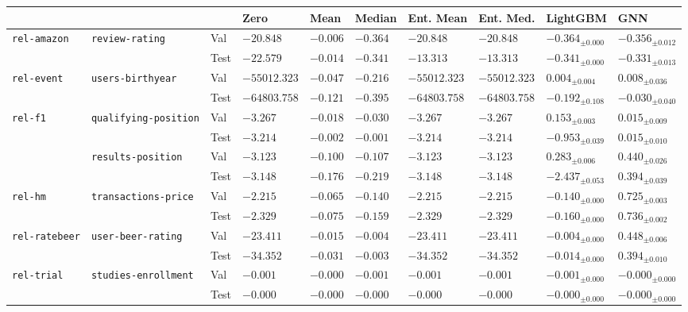 \begin{tabular}{llllllllll}
\toprule
 &  &  & Zero & Mean & Median & Ent. Mean & Ent. Med. & LightGBM & GNN \\
\midrule
\multirow[c]{2}{*}{\texttt{rel-amazon}} & \multirow[c]{2}{*}{\texttt{review-rating}} & Val & $-20.848$ & $\bm{-0.006}$ & $-0.364$ & $-20.848$ & $-20.848$ & $-0.364_{\pm 0.000}$ & $-0.356_{\pm 0.012}$ \\
 &  & Test & $-22.579$ & $\bm{-0.014}$ & $-0.341$ & $-13.313$ & $-13.313$ & $-0.341_{\pm 0.000}$ & $-0.331_{\pm 0.013}$ \\
\cmidrule{1-10} \cmidrule{2-10}
\multirow[c]{2}{*}{\texttt{rel-event}} & \multirow[c]{2}{*}{\texttt{users-birthyear}} & Val & $-55012.323$ & $-0.047$ & $-0.216$ & $-55012.323$ & $-55012.323$ & $0.004_{\pm 0.004}$ & $\bm{0.008}_{\pm 0.036}$ \\
 &  & Test & $-64803.758$ & $-0.121$ & $-0.395$ & $-64803.758$ & $-64803.758$ & $-0.192_{\pm 0.108}$ & $\bm{-0.030}_{\pm 0.040}$ \\
\cmidrule{1-10} \cmidrule{2-10}
 \multirow[c]{4}{*}{\texttt{rel-f1}} & \multirow[c]{2}{*}{\texttt{qualifying-position}} & Val & $-3.267$ & $-0.018$ & $-0.030$ & $-3.267$ & $-3.267$ & $\bm{0.153}_{\pm 0.003}$ & $0.015_{\pm 0.009}$ \\
 &  & Test & $-3.214$ & $-0.002$ & $-0.001$ & $-3.214$ & $-3.214$ & $-0.953_{\pm 0.039}$ & $\bm{0.015}_{\pm 0.010}$ \\
\cmidrule{2-10}
 & \multirow[c]{2}{*}{\texttt{results-position}} & Val & $-3.123$ & $-0.100$ & $-0.107$ & $-3.123$ & $-3.123$ & $0.283_{\pm 0.006}$ & $\bm{0.440}_{\pm 0.026}$ \\
 &  & Test & $-3.148$ & $-0.176$ & $-0.219$ & $-3.148$ & $-3.148$ & $-2.437_{\pm 0.053}$ & $\bm{0.394}_{\pm 0.039}$ \\
\cmidrule{1-10} \cmidrule{2-10}
\multirow[c]{2}{*}{\texttt{rel-hm}} & \multirow[c]{2}{*}{\texttt{transactions-price}} & Val & $-2.215$ & $-0.065$ & $-0.140$ & $-2.215$ & $-2.215$ & $-0.140_{\pm 0.000}$ & $\bm{0.725}_{\pm 0.003}$ \\
 &  & Test & $-2.329$ & $-0.075$ & $-0.159$ & $-2.329$ & $-2.329$ & $-0.160_{\pm 0.000}$ & $\bm{0.736}_{\pm 0.002}$ \\
\cmidrule{1-10} \cmidrule{2-10}
\multirow[c]{2}{*}{\texttt{rel-ratebeer}} & \multirow[c]{2}{*}{\texttt{user-beer-rating}} & Val & $-23.411$ & $-0.015$ & $-0.004$ & $-23.411$ & $-23.411$ & $-0.004_{\pm 0.000}$ & $\bm{0.448}_{\pm 0.006}$ \\
 &  & Test & $-34.352$ & $-0.031$ & $-0.003$ & $-34.352$ & $-34.352$ & $-0.014_{\pm 0.000}$ & $\bm{0.394}_{\pm 0.010}$ \\
\cmidrule{1-10} \cmidrule{2-10}
\multirow[c]{2}{*}{\texttt{rel-trial}} & \multirow[c]{2}{*}{\texttt{studies-enrollment}} & Val & $-0.001$ & $\bm{-0.000}$ & $-0.001$ & $-0.001$ & $-0.001$ & $-0.001_{\pm 0.000}$ & $-0.000_{\pm 0.000}$ \\
 &  & Test & $-0.000$ & $\bm{-0.000}$ & $-0.000$ & $-0.000$ & $-0.000$ & $-0.000_{\pm 0.000}$ & $-0.000_{\pm 0.000}$ \\
\cmidrule{1-10} \cmidrule{2-10}
\bottomrule
\end{tabular}
